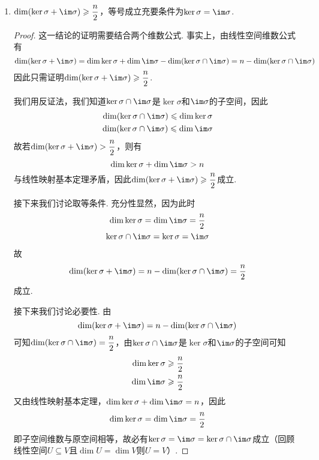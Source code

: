 \begin{enumerate}
    \item $\dim(\ker\sigma+\im \sigma) \geqslant \dfrac{n}{2}$，等号成立充要条件为$\ker\sigma=\im \sigma$.

          \begin{proof}
              这一结论的证明需要结合两个维数公式. 事实上，由线性空间维数公式有
              \[\dim(\ker\sigma+\im \sigma)=\dim\ker\sigma+\dim\im \sigma-\dim(\ker\sigma \cap \im \sigma)=n-\dim(\ker\sigma \cap \im \sigma)\]
              因此只需证明$\dim(\ker\sigma+\im \sigma) \geqslant \dfrac{n}{2}$.

              我们用反证法，我们知道$\ker\sigma\cap \im \sigma$是$\ker\sigma$和$\im\sigma$的子空间，因此
              \begin{gather*}
                  \dim(\ker\sigma\cap \im \sigma) \leqslant \dim\ker\sigma \\
                  \dim(\ker\sigma\cap \im \sigma) \leqslant \dim\im\sigma
              \end{gather*}
              故若$\dim(\ker\sigma+\im \sigma)>\dfrac{n}{2}$，则有
              \[\dim\ker\sigma+\dim\im \sigma>n\]
              与线性映射基本定理矛盾，因此$\dim(\ker\sigma+\im \sigma) \geqslant \dfrac{n}{2}$成立.

              接下来我们讨论取等条件. 充分性显然，因为此时
              \begin{gather*}
                  \dim\ker\sigma=\dim\im\sigma=\dfrac{n}{2} \\
                  \ker\sigma\cap \im \sigma=\ker\sigma=\im\sigma
              \end{gather*}
              故
              \[\dim(\ker\sigma+\im \sigma)=n-\dim(\ker\sigma \cap \im \sigma)=\dfrac{n}{2}\]
              成立.

              接下来我们讨论必要性. 由
              \[\dim(\ker\sigma+\im \sigma)=n-\dim(\ker\sigma \cap \im \sigma)\]
              可知$\dim(\ker\sigma\cap \im \sigma)=\dfrac{n}{2}$，由$\ker\sigma\cap \im \sigma$是$\ker\sigma$和$\im\sigma$的子空间可知
              \begin{align*}
                  \dim\ker\sigma & \geqslant\dfrac{n}{2} \\
                  \dim\im \sigma & \geqslant\dfrac{n}{2}
              \end{align*}
              又由线性映射基本定理，$\dim\ker\sigma+\dim\im \sigma=n$，因此
              \[\dim\ker\sigma=\dim\im \sigma=\dfrac{n}{2}\]
              即子空间维数与原空间相等，故必有$\ker\sigma=\im \sigma=\ker\sigma\cap \im \sigma$成立（回顾线性空间$U\subseteq V$且$\dim U=\dim V$则$U=V$）.
          \end{proof}
\end{enumerate}

